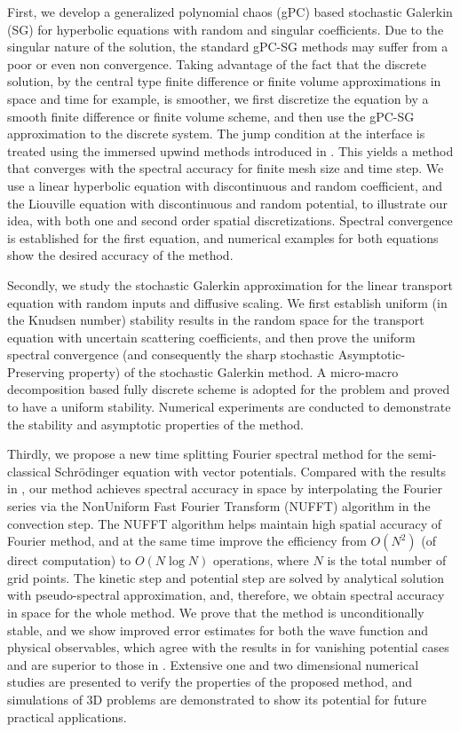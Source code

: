 \begin{englishabstract}

First, we develop a generalized polynomial chaos (gPC) based stochastic Galerkin (SG) for
hyperbolic equations with random and singular coefficients. Due to the singular nature of the solution, the standard gPC-SG methods may suffer from a poor or even
non convergence. Taking advantage of the fact that the discrete solution,
by the central type  finite difference or finite volume approximations
in space and time for example, is smoother, we first discretize the equation by a smooth finite difference or
finite volume scheme, and then use the gPC-SG approximation to the discrete
system. The jump condition at the interface is treated using the immersed
upwind methods introduced in .
This yields a method that converges with the spectral accuracy
for finite mesh size and time step.  We use a linear hyperbolic equation
with discontinuous and random coefficient, and the Liouville equation with
discontinuous and random potential, to illustrate our idea, with both one
and second order spatial discretizations. Spectral convergence is established 
for the first equation, and numerical examples for both equations show the
desired accuracy of the method.

Secondly, we study the stochastic Galerkin approximation for the linear transport equation with random inputs and diffusive scaling. We first establish uniform (in the Knudsen number) stability results in the random space for the
transport equation with uncertain scattering coefficients, and then prove the uniform spectral convergence (and consequently the sharp stochastic Asymptotic-Preserving property)  of the stochastic Galerkin method. A micro-macro decomposition based fully discrete scheme is adopted for the problem and proved to have a uniform stability. Numerical experiments are conducted to demonstrate the stability and asymptotic properties of the method.

Thirdly, we propose a new time splitting Fourier spectral method for the semi-classical Schr\"{o}dinger equation with vector potentials. 
Compared with the results in , our method achieves spectral accuracy in space by interpolating the Fourier series via the 
NonUniform Fast Fourier Transform (NUFFT) algorithm in the convection step.
The NUFFT algorithm helps maintain high spatial accuracy of Fourier method, and at the same time improve the efficiency from $O(N^{2})$ (of direct computation) to $O(N\log N)$ operations, where $N$ is the total number of grid points.
The kinetic step and potential step are solved by analytical solution with pseudo-spectral approximation,  and, 
therefore, we obtain spectral accuracy in space for the whole method.  
We prove that the method is unconditionally stable, and we show improved error estimates for both the wave function and physical observables, which agree with the results in  for vanishing potential cases and are superior to those in  .
Extensive one and two dimensional numerical studies are presented to verify the properties of the proposed method, and simulations of 3D problems are demonstrated to show its potential for  future practical applications.


\end{englishabstract}
